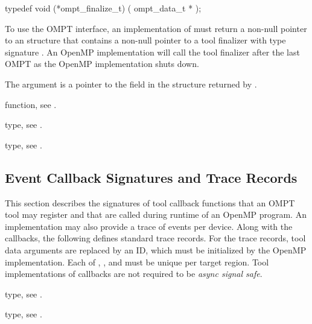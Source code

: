 \begin{ccppspecific}
\begin{omptInquiry}
typedef void (*ompt_finalize_t) (
  ompt_data_t *
);
\end{omptInquiry}
\end{ccppspecific}


\descr
To use the OMPT interface, an implementation of must return 
a non-null pointer to an  structure that contains a
non-null pointer to a tool finalizer with type signature .
An OpenMP implementation will call the tool finalizer after the last OMPT 
 as the OpenMP implementation shuts down.

\argdesc
The  argument is a pointer to the  field in 
the  structure returned by .

\begin{crossrefs}
\item {} function, see .

\item {} type, see
.

\item {} type, see .
\end{crossrefs}



\subsection{Event Callback Signatures and Trace Records}
\label{sec:ToolsSupport_callback_signatures}

This section describes the signatures of tool callback functions that an OMPT
tool may register and that are called during runtime of an OpenMP program. An 
implementation may also provide a trace of events per device. Along with the
callbacks, the following defines standard trace records. For the trace 
records, tool data arguments are replaced by an ID, which must be initialized 
by the OpenMP implementation. Each of , , and 
 must be unique per target region. Tool implementations of 
callbacks are not required to be \emph{async signal safe}.

\begin{crossrefs}
\item {} type, see .

\item {} type, see .
\end{crossrefs}



